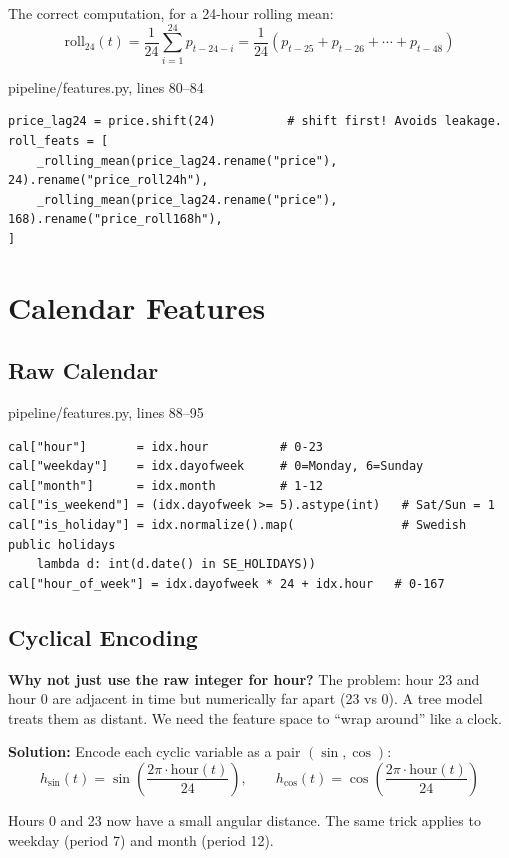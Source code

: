 \documentclass[12pt, a4paper, oneside]{memoir}
\begin{document}
The correct computation, for a 24-hour rolling mean:
\[
  \text{roll}_{24}(t) = \frac{1}{24}\sum_{i=1}^{24} p_{t-24-i}
  = \frac{1}{24}\left(p_{t-25} + p_{t-26} + \cdots + p_{t-48}\right)
\]

\begin{codefile}{pipeline/features.py, lines 80--84}
\begin{verbatim}
price_lag24 = price.shift(24)          # shift first! Avoids leakage.
roll_feats = [
    _rolling_mean(price_lag24.rename("price"), 24).rename("price_roll24h"),
    _rolling_mean(price_lag24.rename("price"), 168).rename("price_roll168h"),
]
\end{verbatim}
\end{codefile}

\section{Calendar Features}

\subsection{Raw Calendar}

\begin{codefile}{pipeline/features.py, lines 88--95}
\begin{verbatim}
cal["hour"]       = idx.hour          # 0-23
cal["weekday"]    = idx.dayofweek     # 0=Monday, 6=Sunday
cal["month"]      = idx.month         # 1-12
cal["is_weekend"] = (idx.dayofweek >= 5).astype(int)   # Sat/Sun = 1
cal["is_holiday"] = idx.normalize().map(               # Swedish public holidays
    lambda d: int(d.date() in SE_HOLIDAYS))
cal["hour_of_week"] = idx.dayofweek * 24 + idx.hour   # 0-167
\end{verbatim}
\end{codefile}

\subsection{Cyclical Encoding}

\begin{keyidea}
\textbf{Why not just use the raw integer for hour?} The problem: hour 23 and hour 0 are
adjacent in time but numerically far apart (23 vs 0). A tree model treats them as distant.
We need the feature space to ``wrap around'' like a clock.

\textbf{Solution:} Encode each cyclic variable as a pair $(\sin, \cos)$:
\[
  h_{\sin}(t) = \sin\!\left(\frac{2\pi \cdot \text{hour}(t)}{24}\right), \qquad
  h_{\cos}(t) = \cos\!\left(\frac{2\pi \cdot \text{hour}(t)}{24}\right)
\]

Hours 0 and 23 now have a small angular distance. The same trick applies to weekday
(period 7) and month (period 12).
\end{keyidea}
\end{document}

